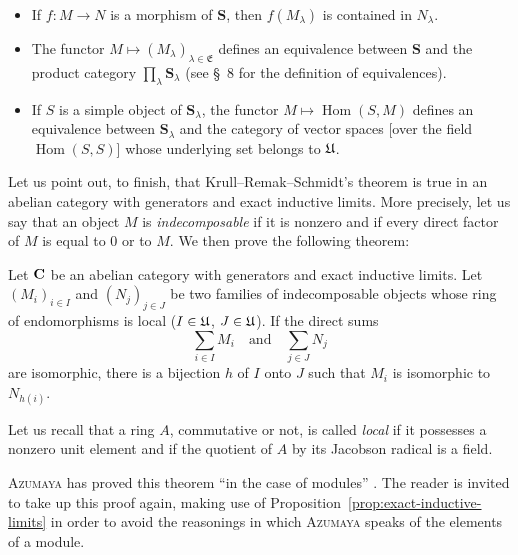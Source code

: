 \begin{itemize}
\item If $f\colon M\to N$ is a morphism of $\mathbf{S}$, then $f(M_\lambda)$
      is contained in $N_\lambda$.

\item The functor $M\mapsto (M_\lambda)_{\lambda\in\mathfrak{E}}$ defines
      an equivalence between $\mathbf{S}$ and the product category
      $\prod\limits_\lambda \mathbf{S}_\lambda$ (see \S~8 for the
      definition of equivalences).

\item If $S$ is a simple object of $\mathbf{S}_\lambda$, the functor
      $M\mapsto \operatorname{Hom}(S, M)$ defines an equivalence between
      $\mathbf{S}_\lambda$ and the category of vector spaces [over the field
      $\operatorname{Hom}(S,S)$] whose underlying set belongs to $\mathfrak{U}$.
\end{itemize}

Let us point out, to finish, that Krull--Remak--Schmidt's theorem is true in
an abelian category with generators and exact inductive limits. More
precisely, let us say that an object $M$ is \emph{indecomposable} if it is
nonzero and if every direct factor of $M$ is equal to $0$ or to $M$. We then
prove the following theorem:

\begin{theorem}
Let $\mathbf{C}$ be an abelian category with generators and exact inductive limits.
Let $(M_i)_{i\in I}$ and $(N_j)_{j\in J}$ be two families of indecomposable
objects whose ring of endomorphisms is local ($I\in\mathfrak{U}$, $J\in\mathfrak{U}$). If
the direct sums
\[
  \sum_{i\in I} M_i \quad\text{and}\quad \sum_{j\in J} N_j
\]
are isomorphic, there is a bijection $h$ of $I$ onto $J$ such that $M_i$ is
isomorphic to $N_{h(i)}$.
\end{theorem}

Let us recall that a ring $A$, commutative or not, is called \emph{local} if
it possesses a nonzero unit element and if the quotient of $A$ by its
Jacobson radical is a field.

\textsc{Azumaya} has proved this theorem ``in the case of modules'' \cite{azumaya-1}. The
reader is invited to take up this proof again, making use of
Proposition~\ref{prop:exact-inductive-limits} in order to avoid the reasonings
in which \textsc{Azumaya} speaks of the elements of a module.